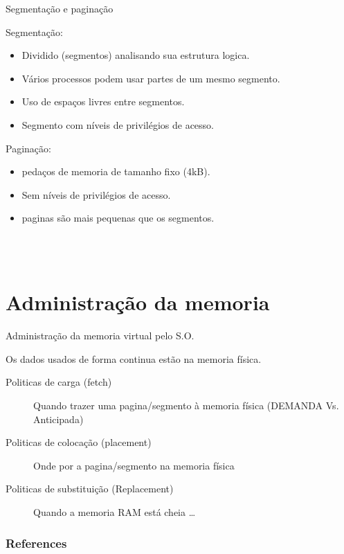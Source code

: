 \documentclass[envcountsect,dvips]{beamer}
\begin{document}
\begin{frame}{Segmentação e paginação}
\begin{minipage}{.45\textwidth}
Segmentação:
\begin{itemize}
 \item Dividido (segmentos) analisando sua estrutura logica.
 \item Vários processos podem usar partes de um mesmo segmento.
  \item Uso de espaços livres entre segmentos.
  \item Segmento com níveis de privilégios de acesso.
\end{itemize}
\end{minipage}
\begin{minipage}{.45\textwidth}
Paginação:
\begin{itemize}
 \item pedaços de memoria de tamanho fixo (4kB).
 \item Sem níveis de privilégios de acesso.
 \item paginas são mais pequenas que os segmentos.
\end{itemize}
~\\
~\\
\end{minipage}%
\end{frame}

\section{Administração da memoria}
\begin{frame}{Administração da memoria virtual pelo S.O.}

Os dados usados de forma continua estão na memoria física.
\begin{description}
  \item[Politicas de carga (fetch)] Quando trazer uma pagina/segmento
  à memoria física  (DEMANDA Vs. Anticipada)
  \item[Politicas de colocação (placement)] Onde por a pagina/segmento
  na memoria física
  \item[Politicas de substituição (Replacement) ] Quando a memoria RAM está cheia \ldots
\end{description}

\end{frame}




\begin{frame}[allowframebreaks]
        \frametitle{References}
        

\end{frame}
\end{document}
